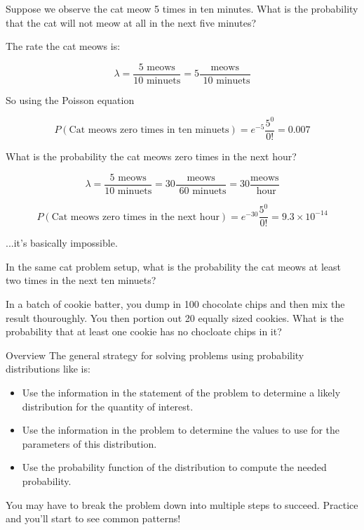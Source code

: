 %
\begin{frame}
Suppose we observe the cat meow 5 times in ten minutes.  What is the probability
that the cat will not meow at all in the next five minutes?
\end{frame}
%

%
\begin{frame}
The rate the cat meows is:

$$ \lambda = \frac{5 \text{ meows}}{10 \text{ minuets}} = 5 \frac{ \text{
meows}}{\text{ 10 minuets}} $$

So using the Poisson equation

$$ P(\text{Cat meows zero times in ten minuets}) = e^{-5} \frac{5^0}{0!} = 0.007
$$
\end{frame}
%

%
\begin{frame}
What is the probability the cat meows zero times in the next hour?

$$ 
\lambda = \frac{5 \text{ meows}}{10 \text{ minuets}} = 30 \frac{ \text{
meows}}{\text{ 60 minuets}} = 30 \frac{ \text{
meows}}{\text{ hour}}
$$

$$ P(\text{Cat meows zero times in the next hour}) = e^{-30} \frac{5^0}{0!} =
9.3 \times 10^{-14}
$$

...it's basically impossible.
\end{frame}
%

%
\begin{frame}

In the same cat problem setup, what is the probability the cat meows at
least two times in the next ten minuets?

\hfill

In a batch of cookie batter, you dump in 100 chocolate chips and then mix the
result thouroughly.  You then portion out 20 equally sized cookies.  What is the
probability that at least one cookie has no chocloate chips in it?

\end{frame}
%

%
\begin{frame}{Overview}
The general strategy for solving problems using probability distributions like is:

\begin{itemize}
\item Use the information in the statement of the problem to determine a likely
distribution for the quantity of interest.
\item Use the information in the problem to determine the values to use for the
parameters of this distribution.
\item Use the probability function of the distribution to compute the needed
probability.
\end{itemize}

You may have to break the problem down into multiple steps to succeed.  Practice
and you'll start to see common patterns!

\end{frame}
%

